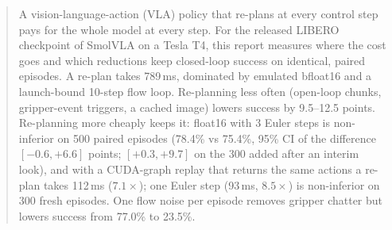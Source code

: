 \begin{abstract}
A vision-language-action (VLA) policy that re-plans at every control step pays for the whole model at every step.
For the released LIBERO checkpoint of SmolVLA on a Tesla T4, this report measures where the cost goes and which reductions keep closed-loop success on identical, paired episodes.
A re-plan takes 789\,ms, dominated by emulated bfloat16 and a launch-bound 10-step flow loop.
Re-planning less often (open-loop chunks, gripper-event triggers, a cached image) lowers success by 9.5--12.5 points.
Re-planning more cheaply keeps it: float16 with 3 Euler steps is non-inferior on 500 paired episodes (78.4\% vs 75.4\%, 95\% CI of the difference $[-0.6, +6.6]$ points; $[+0.3, +9.7]$ on the 300 added after an interim look), and with a CUDA-graph replay that returns the same actions a re-plan takes 112\,ms ($7.1\times$); one Euler step (93\,ms, $8.5\times$) is non-inferior on 300 fresh episodes.
One flow noise per episode removes gripper chatter but lowers success from 77.0\% to 23.5\%.
\end{abstract}

